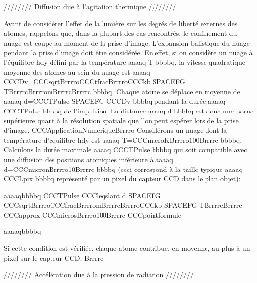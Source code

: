 //////// Diffusion due à l'agitation thermique ////////

Avant de considérer l'effet de la lumière sur les degrés de liberté externes des atomes, rappelons que, dans la plupart des cas rencontrés, le confinement du nuage est coupé au moment de la prise d'image. L'expansion balistique du nuage pendant la prise d'image doit être considérée. En effet, si on considère un nuage à l'équilibre 	hdy défini par la température aaaaq T bbbbq, la vitesse quadratique moyenne des atomes au sein du nuage est aaaaq CCCDv=CCCsqrtBrrrroCCCtfracBrrrroCCCkb SPACEFG TBrrrrcBrrrromBrrrrcBrrrrc bbbbq. Chaque atome se déplace en moyenne
 de aaaaq d=CCCTPulse SPACEFG CCCDv bbbbq pendant la durée aaaaq CCCTPulse bbbbq de l'impulsion. La distance aaaaq d bbbbq est donc une borne supérieure quant à la résolution spatiale que l'on peut espérer lors de la prise d'image.
CCCApplicationNumeriqueBrrrro
Considérons un nuage dont la température d'équilibre 	hdy est aaaaq T=CCCmicroKBrrrro100Brrrrc bbbbq. Calculons la durée maximale aaaaq CCCTPulse bbbbq qui soit compatible avec une diffusion des positions atomiques inférieure à aaaaq d=CCCmicronBrrrro10Brrrrc bbbbq (ceci correspond à la taille typique aaaaq CCCLpix bbbbq représenté par un pixel du capteur CCD dans le plan objet):



aaaaqbbbbq
CCCTPulse CCCleqslant d SPACEFG CCCsqrtBrrrroCCCfracBrrrromBrrrrcBrrrroCCCkb SPACEFG TBrrrrcBrrrrc CCCapprox CCCmicrosBrrrro100Brrrrc
CCCpointformule
	
aaaaqbbbbq



Si cette condition est vérifiée, chaque atome contribue, en moyenne, au plus à un pixel sur le capteur CCD.
Brrrrc


//////// Accélération due à la pression de radiation ////////

